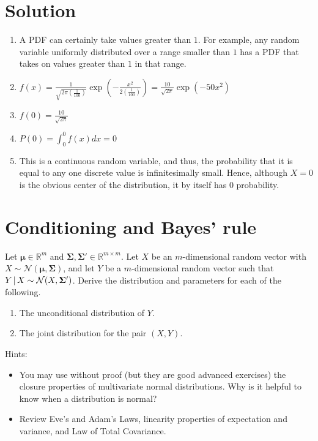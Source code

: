 \documentclass[submit]{harvardml}
\newcommand{\R}{\mathbb{R}}
\renewcommand{\v}[1]{\mathbf{#1}}
\begin{document}
\section*{Solution}

\begin{enumerate}[label=(\alph*)]
    \item A PDF can certainly take values greater than $1$. For example, any random variable uniformly distributed over a range smaller than $1$ has a PDF that takes on values greater than $1$ in that range.
    \item $f(x) = \frac{1}{\sqrt{2 \pi (\frac{1}{100})}} \exp(-\frac{x^2}{2(\frac{1}{100})}) = \frac{10}{\sqrt{2 \pi}} \exp(-50 x^2)$
    \item $f(0) = \frac{10}{\sqrt{2\pi}}$
    \item $P(0) = \int_{0}^{0} f(x) dx = 0 $
    \item This is a continuous random variable, and thus, the probability that it is equal to any one discrete value is infinitesimally small. Hence, although $X=0$ is the obvious center of the distribution, it by itself has $0$ probability.
\end{enumerate}

\newpage
\section*{Conditioning and Bayes' rule}
\begin{problem}
  Let $\v \mu \in \R^m$ and
  $\v \Sigma, \v \Sigma' \in \R^{m \times m}$.  Let $X$ be an
  $m$-dimensional random vector with
  $X \sim \mathcal{N}(\v \mu, \v \Sigma)$, and let $Y$ be a
  $m$-dimensional random vector such that
  $Y \given X \sim \mathcal{N}(X, \v \Sigma')$. Derive the
  distribution and parameters for each of the following.

\begin{enumerate}[label=(\alph*)]
  \item The unconditional distribution of $Y$.

  \item The joint distribution for the pair $(X,Y)$.

\end{enumerate}

Hints:
\begin{itemize}
\item You may use without proof (but they are good advanced exercises)
  the closure properties of multivariate normal distributions. Why is
  it helpful to know when a distribution is normal?
\item Review Eve's and Adam's Laws, linearity properties of
  expectation and variance, and Law of Total Covariance.

\end{itemize}

\end{problem}
\end{document}
